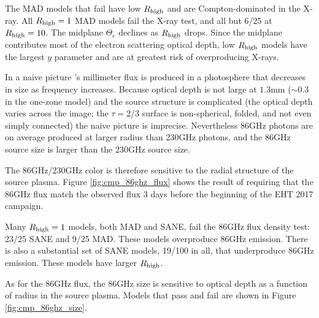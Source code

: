 The MAD models that fail have low $R_\mathrm{high}$ and are Compton-dominated in the X-ray.  All $R_\mathrm{high} = 1$ MAD models fail the X-ray test, and all but 6/25 at $R_\mathrm{high} = 10$.  The midplane $\Theta_e$ declines as $R_\mathrm{high}$ drops.  Since the midplane contributes most of the electron scattering optical depth, low $R_\mathrm{high}$ models have the largest $y$ parameter and are at greatest risk of overproducing X-rays.



In a naive picture \sgra's millimeter flux is produced in a photosphere that decreases in size as frequency increases.  Because optical depth is not large at $1.3$mm ($\sim 0.3$ in the one-zone model) and the source structure is complicated (the optical depth varies across the image; the $\tau = 2/3$ surface is non-spherical, folded, and not even simply connected) the naive picture is imprecise.  Nevertheless 86GHz photons are on average produced at larger radius than 230GHz photons, and the 86GHz source size is larger than the 230GHz source size.

The 86GHz/230GHz color is therefore sensitive to the radial structure of the source plasma.  Figure \ref{fig:cmp_86ghz_flux} shows the result of requiring that the 86GHz flux match the observed flux 3 days before the beginning of the EHT 2017 campaign.

Many $R_\mathrm{high} = 1$ models, both MAD and SANE, fail the $86$GHz flux density test: 23/25 SANE and 9/25 MAD.  These models overproduce $86$GHz emission.
There is also a substantial set of SANE models, 19/100 in all, that underproduce $86$GHz emission.  These models have larger $R_\mathrm{high}$.



As for the $86$GHz flux, the $86$GHz size is sensitive to optical depth as a function of radius in the source plasma. Models that pass and fail are shown in Figure \ref{fig:cmp_86ghz_size}.

